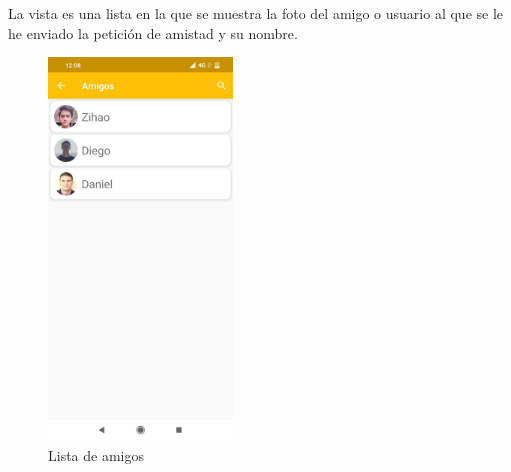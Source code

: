 La vista es una lista en la que se muestra la foto del amigo o usuario al que se le he enviado la petición de amistad y su nombre.
\begin{figure}[H]
    \centering
    \includegraphics[height=4in]{figures/chapter-3/listaAmigos.jpg}
    \caption{Lista de amigos}
    \label{fig:listaAmigos}
\end{figure}
